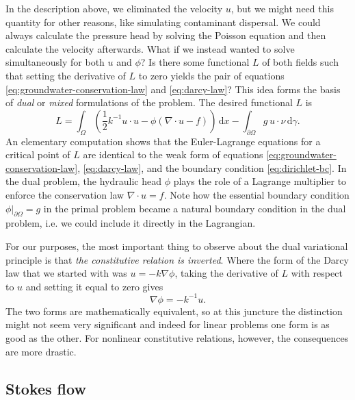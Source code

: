 \documentclass{article}
\theoremstyle{definition}
\theoremstyle{plain}
\newcommand{\ud}{\hspace{2pt}\mathrm{d}}
\begin{document}
In the description above, we eliminated the velocity $u$, but we might need this quantity for other reasons, like simulating contaminant dispersal.
We could always calculate the pressure head by solving the Poisson equation and then calculate the velocity afterwards.
What if we instead wanted to solve simultaneously for both $u$ and $\phi$?
Is there some functional $L$ of both fields such that setting the derivative of $L$ to zero yields the pair of equations \eqref{eq:groundwater-conservation-law} and \eqref{eq:darcy-law}?
This idea forms the basis of \emph{dual} or \emph{mixed} formulations of the problem.
The desired functional $L$ is
\begin{equation}
    L = \int_\Omega\left(\frac{1}{2}k^{-1}u\cdot u - \phi\left(\nabla\cdot u - f\right)\right)\ud x - \int_{\partial\Omega}g\, u\cdot \nu\ud\gamma.
\end{equation}
An elementary computation shows that the Euler-Lagrange equations for a critical point of $L$ are identical to the weak form of equations \eqref{eq:groundwater-conservation-law}, \eqref{eq:darcy-law}, and the boundary condition \eqref{eq:dirichlet-bc}.
In the dual problem, the hydraulic head $\phi$ plays the role of a Lagrange multiplier to enforce the conservation law $\nabla\cdot u = f$.
Note how the essential boundary condition $\phi|_{\partial\Omega} = g$ in the primal problem became a natural boundary condition in the dual problem, i.e. we could include it directly in the Lagrangian.

For our purposes, the most important thing to observe about the dual variational principle is that \emph{the constitutive relation is inverted}.
Where the form of the Darcy law that we started with was $u = -k\nabla\phi$, taking the derivative of $L$ with respect to $u$ and setting it equal to zero gives
\begin{equation}
    \nabla\phi = -k^{-1}u.
\end{equation}
The two forms are mathematically equivalent, so at this juncture the distinction might not seem very significant and indeed for linear problems one form is as good as the other.
For nonlinear constitutive relations, however, the consequences are more drastic.

\subsection{Stokes flow}
\end{document}
